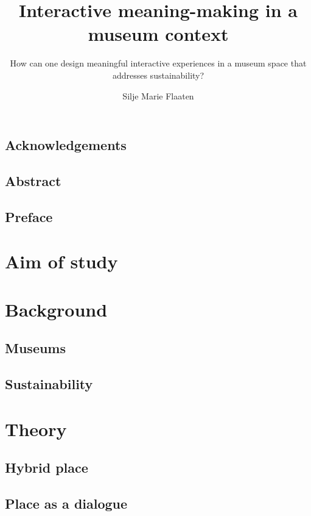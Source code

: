 \documentclass[UKenglish]{ifimaster}
\title{Interactive meaning-making in a museum context}
\subtitle{How can one design meaningful interactive experiences in a museum space that addresses sustainability?}
\author{Silje Marie Flaaten}
\begin{document}
\duoforside[dept={Department of Informatics}, program={Informatics: design, use, interaction},long]



\frontmatter{}
\chapter*{Acknowledgements}


\chapter*{Abstract}


\tableofcontents{}
\listoffigures{}

\chapter*{Preface}


\mainmatter{}
\part{Aim of study}


\part{Background}
\chapter{Museums}

\chapter{Sustainability}


\part{Theory}

\chapter{Hybrid place}

\chapter{Place as a dialogue}

\end{document}

